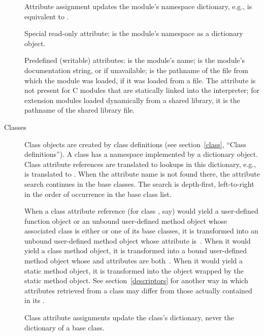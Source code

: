 \begin{description}
Attribute assignment updates the module's namespace dictionary,
e.g.,  is equivalent to .

Special read-only attribute:  is the module's
namespace as a dictionary object.

Predefined (writable) attributes: 
is the module's name;  is the
module's documentation string, or
 if unavailable;  is the pathname of the
file from which the module was loaded, if it was loaded from a file.
The  attribute is not present for C{} modules that are
statically linked into the interpreter; for extension modules loaded
dynamically from a shared library, it is the pathname of the shared
library file.

\item[Classes]
Class objects are created by class definitions (see
section~\ref{class}, ``Class definitions'').
A class has a namespace implemented by a dictionary object.
Class attribute references are translated to
lookups in this dictionary,
e.g.,  is translated to .
When the attribute name is not found
there, the attribute search continues in the base classes.  The search
is depth-first, left-to-right in the order of occurrence in the
base class list.

When a class attribute reference (for class , say)
would yield a user-defined function object or
an unbound user-defined method object whose associated class is either
 or one of its base classes, it is transformed into an unbound
user-defined method object whose  attribute is~.
When it would yield a class method object, it is transformed into
a bound user-defined method object whose  and
 attributes are both~.  When it would yield
a static method object, it is transformed into the object wrapped
by the static method object. See section~\ref{descriptors} for another
way in which attributes retrieved from a class may differ from those
actually contained in its .

Class attribute assignments update the class's dictionary, never the
dictionary of a base class.


\end{description}
